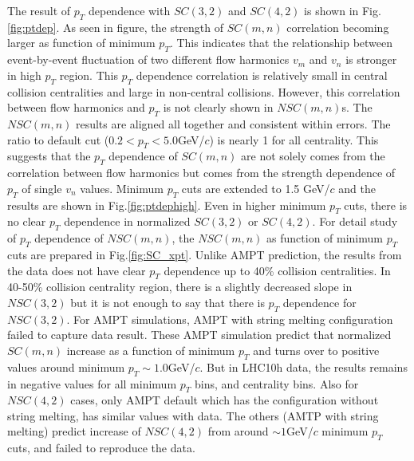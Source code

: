 The result of $p_T$ dependence with $SC(3,2)$ and $SC(4,2)$ is shown in Fig.\ref{fig:ptdep}. As seen in figure, the strength of $SC(m,n)$ correlation becoming larger as function of minimum $p_T$. This indicates that the relationship between event-by-event fluctuation of two different flow harmonics $v_m$ and $v_n$ is stronger in high $p_T$ region. This $p_T$ dependence correlation is relatively small in central collision centralities and large in non-central collisions. However, this correlation between flow harmonics and $p_T$ is not clearly shown in $NSC(m,n)$s. The  $NSC(m,n)$ results are aligned all together and consistent within errors. The ratio to default cut ($0.2 < p_T < 5.0$GeV/$c$) is nearly 1 for all centrality. This suggests that the $p_T$ dependence of $SC(m,n)$ are not solely comes from the correlation between flow harmonics but comes from the strength dependence of $p_T$ of single $v_n$ values. Minimum $p_T$ cuts are extended to 1.5 GeV/$c$ and the results are shown in Fig.\ref{fig:ptdephigh}. Even in higher minimum $p_T$ cuts, there is no clear $p_T$ dependence in normalized $SC(3,2)$ or $SC(4,2)$. For detail study of $p_T$ dependence of  $NSC(m,n)$, the $NSC(m,n)$ as function of minimum $p_T$ cuts are prepared in Fig.\ref{fig:SC_xpt}. Unlike AMPT prediction, the results from the data does not have clear $p_T$ dependence up to 40\% collision centralities. In 40-50\% collision centrality region, there is a slightly decreased slope in $NSC(3,2)$ but it is not enough to say that there is $p_T$ dependence for $NSC(3,2)$. For AMPT simulations, AMPT with string melting configuration failed to capture data result. These AMPT simulation predict that normalized $SC(m,n)$ increase as a function of minimum $p_T$ and turns over to positive values around minimum $p_T \sim 1.0$GeV/$c$. But in LHC10h data, the results remains in negative values for all minimum $p_T$ bins, and centrality bins. Also for $NSC(4,2)$ cases, only AMPT default which has the configuration without string melting, has similar values with data. The others (AMTP with string melting) predict increase of $NSC(4,2)$ from around $\sim 1$GeV/$c$ minimum $p_T$ cuts, and failed to reproduce the data.

